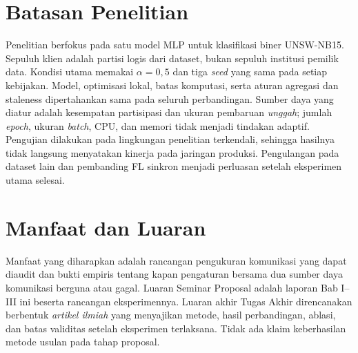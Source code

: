 \section{Batasan Penelitian}
Penelitian berfokus pada satu model MLP untuk klasifikasi biner UNSW-NB15. Sepuluh klien adalah partisi logis dari dataset, bukan sepuluh institusi pemilik data. Kondisi utama memakai $\alpha=0{,}5$ dan tiga \textit{seed} yang sama pada setiap kebijakan. Model, optimisasi lokal, batas komputasi, serta aturan agregasi dan staleness dipertahankan sama pada seluruh perbandingan. Sumber daya yang diatur adalah kesempatan partisipasi dan ukuran pembaruan \emph{unggah}; jumlah \textit{epoch}, ukuran \textit{batch}, CPU, dan memori tidak menjadi tindakan adaptif. Pengujian dilakukan pada lingkungan penelitian terkendali, sehingga hasilnya tidak langsung menyatakan kinerja pada jaringan produksi. Pengulangan pada dataset lain dan pembanding FL sinkron menjadi perluasan setelah eksperimen utama selesai.

\section{Manfaat dan Luaran}
Manfaat yang diharapkan adalah rancangan pengukuran komunikasi yang dapat diaudit dan bukti empiris tentang kapan pengaturan bersama dua sumber daya komunikasi berguna atau gagal. Luaran Seminar Proposal adalah laporan Bab I--III ini beserta rancangan eksperimennya. Luaran akhir Tugas Akhir direncanakan berbentuk \emph{artikel ilmiah} yang menyajikan metode, hasil perbandingan, ablasi, dan batas validitas setelah eksperimen terlaksana. Tidak ada klaim keberhasilan metode usulan pada tahap proposal.
